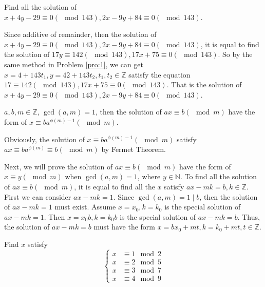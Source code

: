 \documentclass{ctexart}
\begin{document}
\begin{problem}\label{pro:2}
  Find all the solution of \(x + 4y-29 \equiv 0 (\mod 143), 2x-9y + 84 \equiv 0 (\mod 143)\).
\end{problem}
\begin{solution}
  Since additive of remainder, then the solution of \(x + 4y-29 \equiv 0 (\mod 143), 2x-9y + 84 \equiv 0 (\mod 143)\),
  it is equal to find the solution of \(17y \equiv 142 (\mod 143), 17x + 75 \equiv 0 (\mod 143)\).
  So by the same method in Problem \ref{pro:1}, we can get \(x = 4 + 143 t_1, y = 42 + 143t_2, t_1,t_2 \in \mathbb{Z}\)
  satisfy the equation \(17 \equiv 142 ( \mod 143), 17x + 75 \equiv 0 (\mod 143)\).
  That is the solution of \(x + 4y - 29 \equiv 0 (\mod 143), 2x - 9y + 84 \equiv 0 ( \mod 143)\).
\end{solution}
\begin{problem}\label{pro:3}
  \(a,b,m \in \mathbb{Z}\), \(\gcd(a,m)=1\), then the solution of \(ax \equiv b (\mod m)\) have the
  form of \(x \equiv ba^{\phi(m)-1}(\mod m)\).
\end{problem}
\begin{solution}
  Obviously, the solution of \(x \equiv ba^{\phi(m)-1} (\mod m)\) satisfy \(ax \equiv ba^{\phi(m)} \equiv b (\mod m)\)
  by Fermet Theorem.

  Next, we will prove the solution of \(ax \equiv b(\mod m)\) have the form of \(x \equiv y (\mod m)\)
  when \(\gcd(a,m)=1\), where \(y \in \mathbb{N}\).
  To find all the solution of \(ax \equiv b (\mod m)\), it is equal to find all the \(x\) satisfy
  \(ax-mk=b, k \in \mathbb{Z}\). First we can consider \(ax-mk=1\). Since \(\gcd(a,m)=1 \mid b\), then
  the solution of \(ax-mk=1\) must exist.
  Assume \( x= x_0,k=k_0\) is the special solution of \(ax-mk=1\). Then \(x=x_0b,k=k_0b\) is
  the special solution of \(ax-mk=b\).
  Thus, the solution of \(ax-mk=b\) must have the form \(x =bx_0 + mt,k=k_{0} + mt,t \in \mathbb{Z}\).
\end{solution}
\begin{problem}\label{pro:4}
  Find \(x\) satisfy
  \begin{equation}\label{equ:4}
    \begin{cases}
      x & \equiv 1 \mod 2 \\
      x & \equiv 2 \mod 5 \\
      x & \equiv 3 \mod 7 \\
      x & \equiv 4 \mod 9
    \end{cases}
  \end{equation}
\end{problem}
\end{document}
